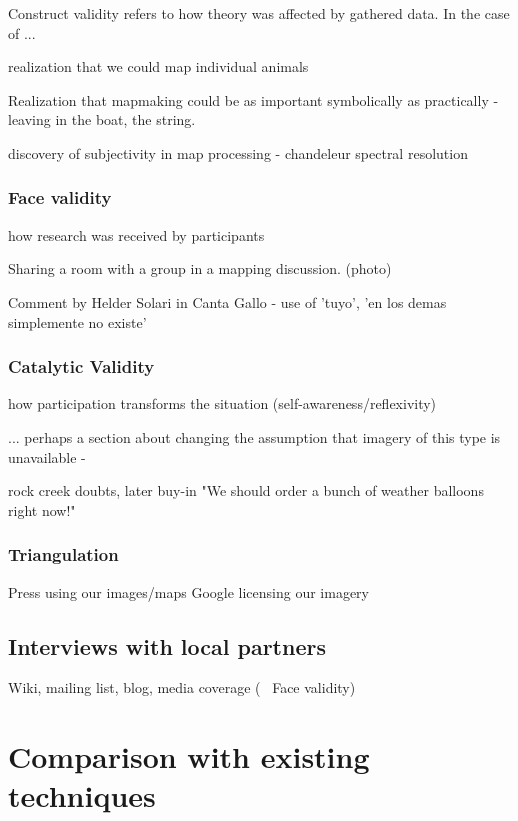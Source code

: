 \documentclass[11pt]{report}
\begin{document}
Construct validity refers to how theory was affected by gathered data. In the case of ...

realization that we could map individual animals

Realization that mapmaking could be as important symbolically as practically - leaving in the boat, the string.

discovery of subjectivity in map processing - chandeleur spectral resolution

\subsubsection{Face validity}

how research was received by participants

Sharing a room with a group in a mapping discussion. (photo)

Comment by Helder Solari in Canta Gallo - use of 'tuyo', 'en los demas simplemente no existe'

\subsubsection{Catalytic Validity}

how participation transforms the situation (self-awareness/reflexivity)

... perhaps a section about changing the assumption that imagery of this type is unavailable - 

rock creek doubts, later buy-in "We should order a bunch of weather balloons right now!"

\subsubsection{Triangulation}

Press using our images/maps
Google licensing our imagery

\subsection{Interviews with local partners}
Wiki, mailing list, blog, media coverage (~ Face validity)

\section{Comparison with existing techniques}

\end{document}
